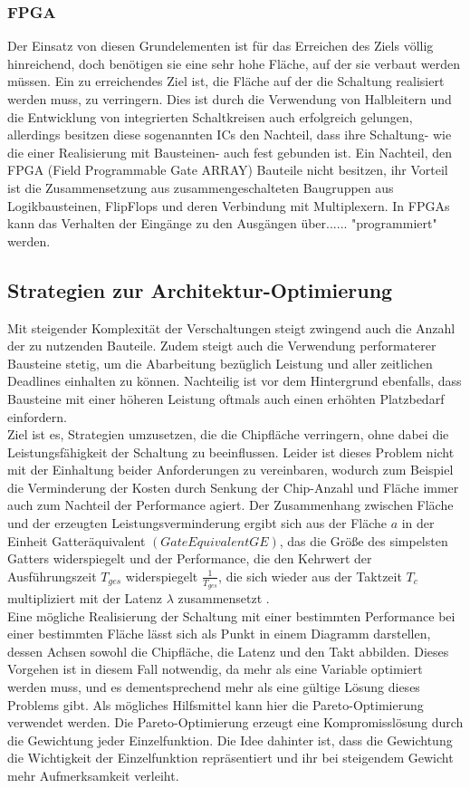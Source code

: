 \documentclass[conference]{IEEEtran}
\begin{document}
\subsubsection{FPGA}
Der Einsatz von diesen Grundelementen ist für das Erreichen des Ziels völlig hinreichend, doch benötigen sie eine sehr hohe Fläche, auf der sie verbaut werden müssen. Ein zu erreichendes Ziel ist, die Fläche auf der die Schaltung realisiert werden muss, zu verringern. Dies ist durch die Verwendung von Halbleitern und die Entwicklung von integrierten Schaltkreisen auch erfolgreich gelungen, allerdings besitzen diese sogenannten ICs den Nachteil, dass ihre Schaltung- wie die einer Realisierung mit Bausteinen- auch fest gebunden ist. Ein Nachteil, den FPGA (Field Programmable Gate ARRAY) Bauteile nicht besitzen, ihr Vorteil ist die Zusammensetzung aus zusammengeschalteten Baugruppen aus Logikbausteinen, FlipFlops und deren Verbindung mit Multiplexern. In FPGAs kann das Verhalten der Eingänge zu den Ausgängen über{\color{red}...... }"programmiert" werden.
\subsection{Strategien zur Architektur-Optimierung}
Mit steigender Komplexität der Verschaltungen steigt zwingend auch die Anzahl der  zu nutzenden Bauteile. Zudem steigt auch die Verwendung performaterer Bausteine stetig, um die Abarbeitung bezüglich Leistung und aller zeitlichen Deadlines einhalten zu können. Nachteilig ist vor dem Hintergrund ebenfalls, dass Bausteine mit einer höheren Leistung oftmals auch einen erhöhten Platzbedarf einfordern\cite[S.327]{2}.\\
Ziel ist es, Strategien umzusetzen, die die Chipfläche verringern, ohne dabei die Leistungsfähigkeit der Schaltung zu beeinflussen. Leider ist dieses Problem nicht mit der Einhaltung beider Anforderungen zu vereinbaren, wodurch zum Beispiel die Verminderung der Kosten durch Senkung der Chip-Anzahl und Fläche immer auch zum Nachteil der Performance agiert. Der Zusammenhang zwischen Fläche und der erzeugten Leistungsverminderung ergibt sich aus der Fläche $a$ in der Einheit Gatteräquivalent $(Gate Equivalent GE)$, das die Größe des simpelsten Gatters widerspiegelt\cite[S.326]{2} und der Performance, die den Kehrwert der Ausführungszeit $T_{ges}$ widerspiegelt $\frac{1}{T_{ges}}$, die sich wieder aus der Taktzeit $T_c$ multipliziert mit der Latenz $\lambda$ zusammensetzt
\cite[S.325-326]{2}.\\
 Eine mögliche Realisierung der Schaltung mit einer bestimmten Performance bei einer bestimmten Fläche lässt sich als Punkt in einem Diagramm darstellen, dessen Achsen sowohl die Chipfläche, die Latenz und den Takt abbilden\cite[S.326]{2}.
 Dieses Vorgehen\cite{?} ist in diesem Fall notwendig, da mehr als eine Variable optimiert werden muss, und es dementsprechend mehr als eine gültige Lösung dieses Problems gibt. Als mögliches Hilfsmittel kann hier die Pareto-Optimierung verwendet werden. Die Pareto-Optimierung erzeugt eine Kompromisslösung durch die Gewichtung jeder Einzelfunktion. Die Idee dahinter ist, dass die Gewichtung die Wichtigkeit der Einzelfunktion repräsentiert und ihr bei steigendem Gewicht mehr Aufmerksamkeit verleiht\cite[S.45]{4}.
\end{document}

